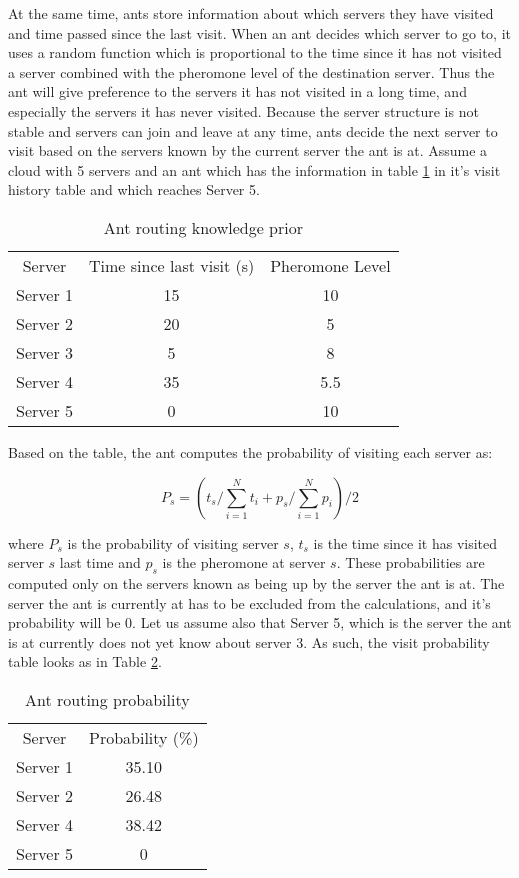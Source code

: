 At the same time, ants store information about which servers they have visited and time passed since the last visit. When an ant decides which server to go to, it uses a random function which is proportional to the time since it has not visited a server combined with the pheromone level of the destination server. Thus the ant will give preference to the servers it has not visited in a long time, and especially the servers it has never visited. Because the server structure is not stable and servers can join and leave at any time, ants decide the next server to visit based on the servers known by the current server the ant is at.  Assume a cloud with 5 servers and an ant which has the information in table \ref{tab:ant_prio} in it's visit history table and which reaches Server 5.

\begin{table}
\centering
\begin{tabular}{c|c|c}
Server & Time since last visit (s) & Pheromone Level \\
Server 1 & 15 & 10 \\ 
Server 2 & 20 & 5 \\
Server 3 & 5 & 8 \\
Server 4 & 35 & 5.5 \\
Server 5 & 0 & 10 \\
\end{tabular}
\caption{Ant routing knowledge prior}
\label{tab:ant_prio}
\end{table}

Based on the table, the ant computes the probability of visiting each server as:

\begin{equation}
P_s = (t_s / \sum_{i=1}^{N} t_i + p_{s} / \sum_{i=1}^{N} p_i) / 2
\end{equation}

where $P_s$ is the probability of visiting server $s$, $t_s$ is the time since it has visited server $s$ last time and $p_{s}$ is the pheromone at server $s$. These probabilities are computed only on the servers known as being up by the server the ant is at. The server the ant is currently at has to be excluded from the calculations, and it's probability will be 0. Let us assume also that Server 5, which is the server the ant is at currently does not yet know about server 3. As such, the visit probability table looks as in Table \ref{tab:ant_prob}.

\begin{table}
\centering
\begin{tabular}{c|c}
Server & Probability (\%) \\
Server 1 & 35.10 \\
Server 2 & 26.48 \\
Server 4 & 38.42 \\
Server 5 & 0 \\
\end{tabular}
\caption{Ant routing probability}
\label{tab:ant_prob}
\end{table}

